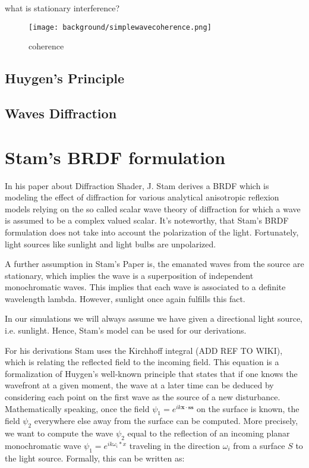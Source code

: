 what is stationary interference?

\begin{figure}[H]
  \centering
  \texttt{[image: background/simplewavecoherence.png]}
  \caption{coherence}
  \label{fig:mathcoherentwaves}
\end{figure}

\subsection{Huygen's Principle}
\subsection{Waves Diffraction}


\section{Stam's BRDF formulation}
\label{sec:sumstam}
In his paper about Diffraction Shader, J. Stam derives a BRDF which is modeling the effect of diffraction for various analytical anisotropic reflexion models relying on the so called scalar wave theory of diffraction for which a wave is assumed to be a complex valued scalar. 
It's noteworthy, that Stam's BRDF formulation does not take into account the polarization of the light. Fortunately, light sources like sunlight and light bulbs are unpolarized. 

A further assumption in Stam's Paper is, the emanated waves from the source are stationary, which implies the wave is a superposition of independent monochromatic waves. This implies that each wave is associated to a definite wavelength lambda. However, sunlight once again fulfills this fact.

In our simulations we will always assume we have given a directional light source, i.e. sunlight. Hence, Stam's model can be used for our derivations.

For his derivations Stam uses the Kirchhoff integral (ADD REF TO WIKI), which is relating the reflected field to the incoming field. This equation is a formalization of Huygen’s well-known principle that states that if one knows the wavefront at a given moment, the wave at a later time can be deduced by considering each point on the first wave as the source of a new disturbance. Mathematically speaking, once the field  $\psi_1 =  e^{ik\mathbf{x} \cdot \mathbf{s}\mathbf{s}}$ on the surface is known, the field $\psi_2$ everywhere else away from the surface can be computed.
More precisely, we want to compute the wave $\psi_2$ equal to the reflection of an incoming planar monochromatic wave $\psi_1 = e^{ik \omega_i * x}$  traveling in the direction $\omega_i$ from a surface $S$ to the light source. Formally, this can be written as:

